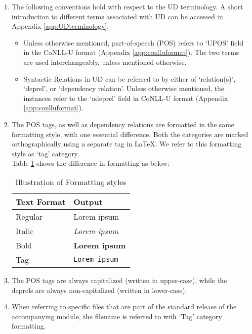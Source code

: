 \begin{enumerate}
    \item The following conventions hold with respect to the UD terminology. A short introduction to different terms associated with UD can be accessed in Appendix \ref{app:UDterminology}.
    \begin{itemize}
        \item Unless otherwise mentioned, part-of-speech (POS) refers to `UPOS' field in the CoNLL-U format (Appendix \ref{app:conlluformat}). The two terms are used interchangeably, unless mentioned otherwise.
        \item Syntactic Relations in UD can be referred to by either of `relation(s)', `deprel', or `dependency relation'. Unless otherwise mentioned, the instances refer to the `udeprel' field in CoNLL-U format (Appendix \ref{app:conlluformat}).
    \end{itemize}
    
    \item The POS tags, as well as dependency relations are formatted in the same formatting style, with one essential difference. Both the categories are marked orthographically using a separate tag in \LaTeX. We refer to this formatting style as `tag' category. \\
    Table \ref{tab:formats} shows the difference in formatting as below:

        \begin{table}[H]
            \centering
            \begin{tabular}{|l|l|}
            \hline
            Text Format & Output \\
            \hline \hline
            Regular & Lorem ipsum \\
            Italic & \textit{Lorem ipsum}\\
            Bold & \textbf{Lorem ipsum}\\
            Tag & \verb|Lorem ipsum| \\
            \hline
        \end{tabular}
        \caption{Illustration of Formatting styles}
        \label{tab:formats}
        \end{table}

    \item The POS tags are always capitalized (written in upper-case), while the deprels are always non-capitalized (written in lower-case).
    
    \item When referring to specific files that are part of the standard release of the accompanying module, the filename is referred to with `Tag' category formatting.
    

\end{enumerate}

